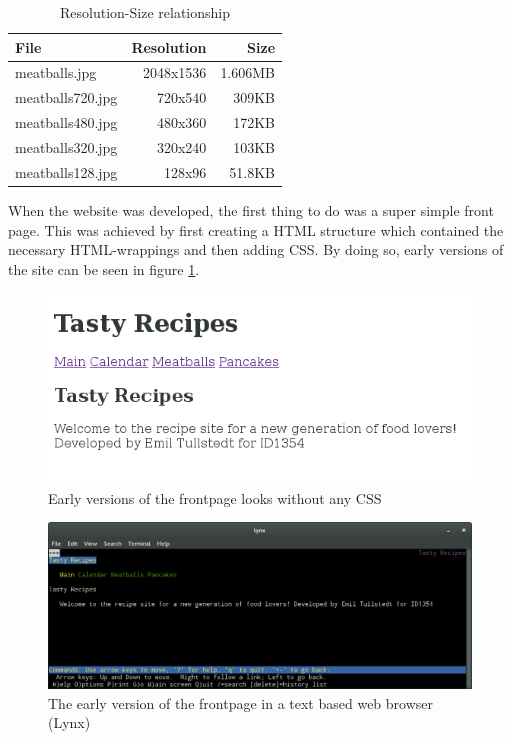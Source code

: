 \documentclass[a4paper]{scrartcl}
\begin{document}
 \begin{table}[h]
   \centering
   \begin{tabular}{|l|r|r|}
     \hline
     File & Resolution & Size\\
     \hline
     meatballs.jpg & 2048x1536 & 1.606MB\\
     \hline
     meatballs720.jpg & 720x540 & 309KB\\
	 \hline
	 meatballs480.jpg & 480x360 & 172KB\\   
     \hline
     meatballs320.jpg & 320x240 & 103KB\\
     \hline
     meatballs128.jpg & 128x96 & 51.8KB\\
     \hline
   \end{tabular}
   \caption{Resolution-Size relationship}
   \label{tab:ressize}
 \end{table}

When the website was developed, the first thing to do was a super simple front page. This was achieved by first creating a HTML structure which contained the necessary HTML-wrappings and then adding CSS. By doing so, early versions of the site can be seen in figure \ref{fig:frontpage no css}.

\begin{figure}[!h]
  \begin{center}
    \includegraphics[scale=0.6]{frontpageWOcss.png}
    \caption{Early versions of the frontpage looks without any CSS}
    \label{fig:frontpage no css}
  \end{center}
\end{figure}

\begin{figure}[!h]
  \begin{center}
    \includegraphics[scale=0.4]{lynx.png}
    \caption{The early version of the frontpage in a text based web browser (Lynx)}
    \label{fig:lynx}
  \end{center}
\end{figure}
\end{document}
